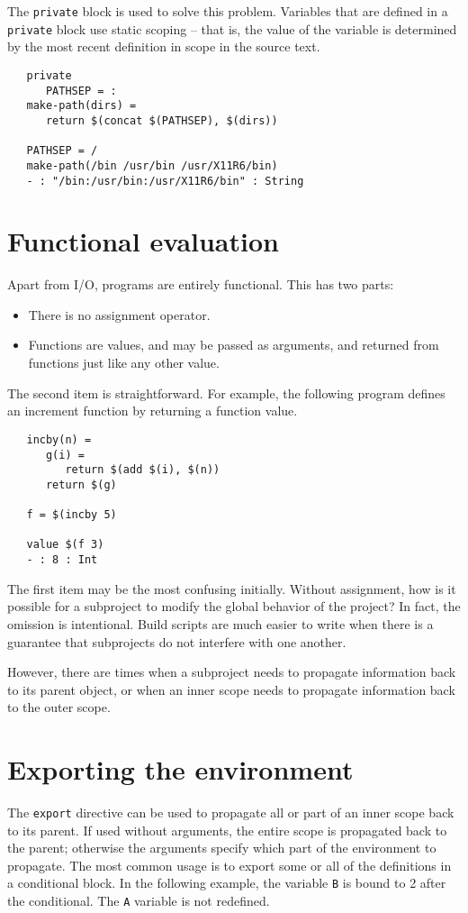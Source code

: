 The \verb+private+ block is used to solve this problem.  Variables
that are defined in a \verb+private+ block use static scoping -- that
is, the value of the variable is determined by the most recent
definition in scope in the source text.

\begin{verbatim}
   private
      PATHSEP = :
   make-path(dirs) =
      return $(concat $(PATHSEP), $(dirs))

   PATHSEP = /
   make-path(/bin /usr/bin /usr/X11R6/bin)
   - : "/bin:/usr/bin:/usr/X11R6/bin" : String
\end{verbatim}

\section{Functional evaluation}

Apart from I/O,  programs are entirely functional.  This has two parts:

\begin{itemize}
\item There is no assignment operator.
\item Functions are values, and may be passed as arguments, and returned from
      functions just like any other value.
\end{itemize}

The second item is straightforward.  For example, the following program defines
an increment function by returning a function value.

\begin{verbatim}
   incby(n) =
      g(i) =
         return $(add $(i), $(n))
      return $(g)

   f = $(incby 5)

   value $(f 3)
   - : 8 : Int
\end{verbatim}

The first item may be the most confusing initially.  Without assignment, how is
it possible for a subproject to modify the global behavior of the project?  In fact,
the omission is intentional.  Build scripts are much easier to write when there
is a guarantee that subprojects do not interfere with one another.

However, there are times when a subproject needs to propagate
information back to its parent object, or when an inner scope needs to
propagate information back to the outer scope.

\section{Exporting the environment}
\label{section:export}
The \verb+export+ directive can be used to propagate all or part of an inner scope back to its
parent.  If used without
arguments, the entire scope is propagated back to the parent; otherwise the arguments specify which
part of the environment to propagate.  The most common usage is to export some or all of the definitions in a
conditional block.  In the following example, the variable \verb+B+ is bound to 2 after the
conditional.  The \verb+A+ variable is not redefined.

